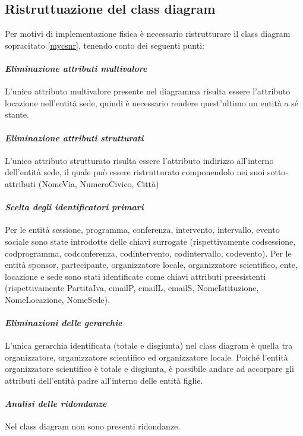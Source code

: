 \documentclass[a4page]{article}
\begin{document}
\subsection{Ristruttuazione del class diagram}
Per motivi di implementazione fisica è necessario ristrutturare il class diagram sopracitato \ref{mycsnr}, tenendo conto dei seguenti punti:
\paragraph{\textit{Eliminazione attributi multivalore}}
L'unico attributo multivalore presente nel diagramma risulta essere l'attributo locazione nell'entità sede, quindi è necessario rendere quest'ultimo un entità a sé stante. 
\paragraph{\textit{Eliminazione attributi strutturati}}
L'unico attributo strutturato risulta essere l'attributo indirizzo all'interno dell'entità sede, il quale può essere ristrutturato componendolo nei suoi sotto-attributi (NomeVia, NumeroCivico, Città)
\paragraph{\textit{Scelta degli identificatori primari}}
Per le entità sessione, programma, conferenza, intervento, intervallo, evento sociale sono state introdotte delle chiavi surrogate (rispettivamente codsessione, codprogramma, codconferenza, codintervento, codintervallo, codevento).
Per le entità sponsor, partecipante, organizzatore locale, organizzatore scientifico, ente, locazione e sede sono stati identificate come chiavi attributi preesistenti (rispettivamente PartitaIva, emailP, emailL, emailS, NomeIstituzione, NomeLocazione, NomeSede).
\paragraph{\textit{Eliminazioni delle gerarchie}}
L'unica gerarchia identificata (totale e disgiunta) nel class diagram è quella tra organizzatore, organizzatore scientifico ed organizzatore locale. Poiché l'entità organizzatore scientifico è totale e disgiunta, è possibile andare ad accorpare gli attributi dell'entità padre all'interno delle entità figlie.
\paragraph{\textit{Analisi delle ridondanze}}
Nel class diagram non sono presenti ridondanze.
\newpage
\end{document}
